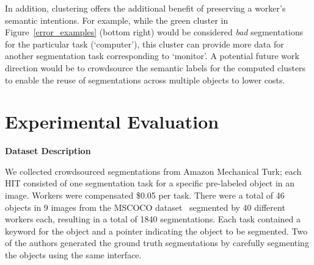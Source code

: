 \documentclass[letterpaper]{article}
\newcommand{\techreport}[1]{}
\newcommand{\agp}[1]{\textcolor{magenta}{Aditya: #1}}
\newcommand{\dor}[1]{\textcolor{blue}{Doris: #1}}
\newcommand{\stitle}[1]{\noindent \textbf{#1}}
\begin{document}
\par In addition, clustering offers the additional benefit of preserving a worker's semantic intentions. For example, while the green cluster in Figure~\ref{error_examples} (bottom right) would be considered \textit{bad} segmentations for the particular task (`computer'), this cluster can provide more data for another segmentation task corresponding to `monitor'. A potential future work direction would be to crowdsource the semantic labels for the computed clusters to enable the reuse of segmentations across multiple objects to lower costs.%

\section{Experimental Evaluation\label{sec:experiment}}

\stitle{Dataset Description\label{dataset}}
\par \noindent We collected crowdsourced segmentations from Amazon Mechanical Turk; each HIT consisted of one segmentation task for a specific pre-labeled object in an image. Workers were compensated \$0.05 per task. There were a total of 46 objects in 9 images from the MSCOCO dataset~\cite{Lin2014} segmented by 40 different workers each, resulting in a total of 1840 segmentations. Each task contained a keyword for the object and a pointer indicating the object to be segmented. Two of the authors generated the ground truth segmentations by carefully segmenting the objects using the same interface. %
\techreport{\par A sub-sampled dataset was created from the full dataset to determine the efficacy of these algorithms on varying number of worker responses. Every object was randomly sampled worker with replacement. For small worker samples, we average our results over larger number of batches than for large worker samples (which have lower variance, since the sample size is close to the original data size).}
\end{document}
